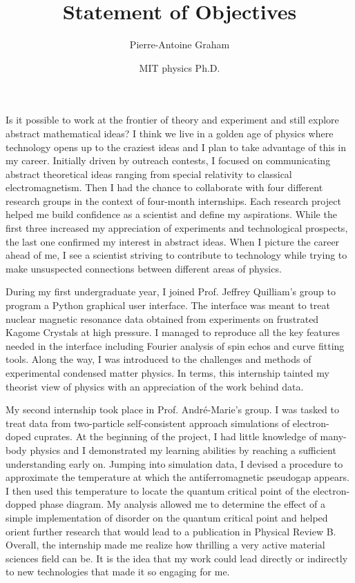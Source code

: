 \documentclass[12pt]{article}
\title{Statement of Objectives}
\author{Pierre-Antoine Graham}
\date{MIT physics Ph.D.}
\begin{document}
\maketitle
\vspace{0.5cm}


Is it possible to work at the frontier of theory and experiment and still explore abstract mathematical ideas? I think we live in a golden age of physics where technology opens up to the craziest ideas and I plan to take advantage of this in my career. Initially driven by outreach contests, I focused on communicating abstract theoretical ideas ranging from special relativity to classical electromagnetism. Then I had the chance to collaborate with four different research groups in the context of four-month internships. Each research project helped me build confidence as a scientist and define my aspirations. While the first three increased my appreciation of experiments and technological prospects, the last one confirmed my interest in abstract ideas. When I picture the career ahead of me, I see a scientist striving to contribute to technology while trying to make unsuspected connections between different areas of physics. 
\vspace{0.4cm}

During my first undergraduate year, I joined Prof. Jeffrey Quilliam's group to program a Python graphical user interface. The interface was meant to treat nuclear magnetic resonance data obtained from experiments on frustrated Kagome Crystals at high pressure. I managed to reproduce all the key features needed in the interface including Fourier analysis of spin echos and curve fitting tools. Along the way, I was introduced to the challenges and methods of experimental condensed matter physics. In terms, this internship tainted my theorist view of physics with an appreciation of the work behind data.\vspace{0.4cm}

My second internship took place in Prof. André-Marie's group. I was tasked to treat data from two-particle self-consistent approach simulations of electron-doped cuprates. At the beginning of the project, I had little knowledge of many-body physics and I demonstrated my learning abilities by reaching a sufficient understanding early on. Jumping into simulation data, I devised a procedure to approximate the temperature at which the antiferromagnetic pseudogap appears. I then used this temperature to locate the quantum critical point of the electron-dopped phase diagram. My analysis allowed me to determine the effect of a simple implementation of disorder on the quantum critical point and helped orient further research that would lead to a publication in Physical Review B. Overall, the internship made me realize how thrilling a very active material sciences field can be. It is the idea that my work could lead directly or indirectly to new technologies that made it so engaging for me.\vspace{0.4cm} 
\end{document}

